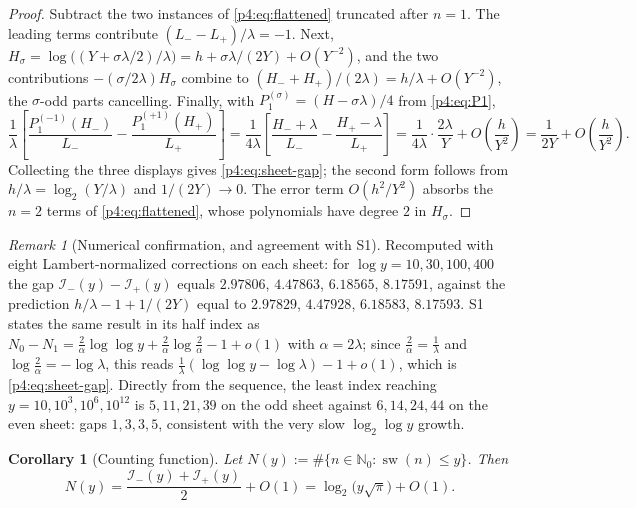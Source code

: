 \documentclass[11pt,a4paper,oneside]{book}
\theoremstyle{plain}
\newtheorem{corollary}[theorem]{Corollary}
\theoremstyle{definition}
\theoremstyle{remark}
\newtheorem{remark}[theorem]{Remark}
\newcommand{\Nat}{\mathbb{N}}
\begin{document}
\begin{proof}
Subtract the two instances of \cref{p4:eq:flattened} truncated after $n=1$.
The leading terms contribute $(L_--L_+)/\lambda=-1$.  Next,
$H_\sigma=\log\bigl((Y+\sigma\lambda/2)/\lambda\bigr)
 =h+\sigma\lambda/(2Y)+O(Y^{-2})$, and the two contributions
$-(\sigma/2\lambda)H_\sigma$ combine to
$(H_-+H_+)/(2\lambda)=h/\lambda+O(Y^{-2})$, the $\sigma$-odd parts
cancelling.  Finally, with $P^{(\sigma)}_1=(H-\sigma\lambda)/4$ from
\cref{p4:eq:P1},
\[
  \frac1\lambda\left[\frac{P^{(-1)}_1(H_-)}{L_-}
   -\frac{P^{(+1)}_1(H_+)}{L_+}\right]
  =\frac1{4\lambda}\left[\frac{H_-+\lambda}{L_-}-\frac{H_+-\lambda}{L_+}
   \right]
  =\frac1{4\lambda}\cdot\frac{2\lambda}{Y}+O\!\left(\frac{h}{Y^{2}}\right)
  =\frac1{2Y}+O\!\left(\frac{h}{Y^{2}}\right).
\]
Collecting the three displays gives \cref{p4:eq:sheet-gap}; the second form
follows from $h/\lambda=\log_2(Y/\lambda)$ and $1/(2Y)\to0$.  The error term
$O(h^{2}/Y^{2})$ absorbs the $n=2$ terms of \cref{p4:eq:flattened}, whose
polynomials have degree $2$ in $H_\sigma$.
\end{proof}

\begin{remark}[Numerical confirmation, and agreement with \textsf{S1}]
\label{p4:rem:gap-numeric}
Recomputed with eight Lambert-normalized corrections on each sheet: for
$\log y=10,30,100,400$ the gap $\mathcal I_-(y)-\mathcal I_+(y)$ equals
$2.97806$, $4.47863$, $6.18565$, $8.17591$, against the prediction
$h/\lambda-1+1/(2Y)$ equal to $2.97829$, $4.47928$, $6.18583$, $8.17593$.
\textsf{S1} states the same result in its half index as
$N_0-N_1=\tfrac2\alpha\log\log y+\tfrac2\alpha\log\tfrac2\alpha-1+o(1)$ with
$\alpha=2\lambda$; since $\tfrac2\alpha=\tfrac1\lambda$ and
$\log\tfrac2\alpha=-\log\lambda$, this reads
$\tfrac1\lambda(\log\log y-\log\lambda)-1+o(1)$, which is
\cref{p4:eq:sheet-gap}.  Directly from the sequence, the least index reaching
$y=10,10^{3},10^{6},10^{12}$ is $5,11,21,39$ on the odd sheet against
$6,14,24,44$ on the even sheet: gaps $1,3,3,5$, consistent with the very slow
$\log_2\log y$ growth.
\end{remark}

\begin{corollary}[Counting function]
\label{p4:cor:counting}
Let $N(y):=\#\{n\in\Nat_0:\operatorname{sw}(n)\le y\}$.  Then
\begin{equation}
  N(y)=\frac{\mathcal I_-(y)+\mathcal I_+(y)}{2}+O(1)
   =\log_2\bigl(y\sqrt\pi\bigr)+O(1).
  \label{p4:eq:counting}
\end{equation}
\end{corollary}
\end{document}
